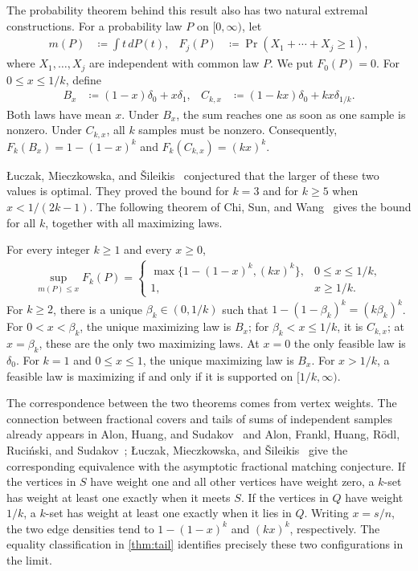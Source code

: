 The probability theorem behind this result also has two natural extremal constructions. For a probability law $P$ on $[0,\infty)$, let
\begin{align}
m(P)&\coloneqq\int t\,dP(t), &
F_j(P)&\coloneqq\Pr(X_1+\cdots+X_j\ge1),
\label{eq:tail-definition}
\end{align}
where $X_1,\ldots,X_j$ are independent with common law $P$. We put $F_0(P)=0$. For $0\le x\le1/k$, define
\begin{align}
B_x&\coloneqq(1-x)\delta_0+x\delta_1, &
C_{k,x}&\coloneqq(1-kx)\delta_0+kx\delta_{1/k}.
\label{eq:standard-laws}
\end{align}
Both laws have mean $x$. Under $B_x$, the sum reaches one as soon as one sample is nonzero. Under $C_{k,x}$, all $k$ samples must be nonzero. Consequently, $F_k(B_x)=1-(1-x)^k$ and $F_k(C_{k,x})=(kx)^k$.

{\L}uczak, Mieczkowska, and {\v S}ileikis~\cite{LMS2017} conjectured that the larger of these two values is optimal. They proved the bound for $k=3$ and for $k\ge5$ when $x<1/(2k-1)$. The following theorem of Chi, Sun, and Wang~\cite[Theorem 1.2]{CSW2026} gives the bound for all $k$, together with all maximizing laws.
\begin{theorem}\label{thm:tail}
For every integer $k\ge1$ and every $x\ge0$,
\begin{align}
\sup_{m(P)\le x}F_k(P)=
\begin{cases}
\max\{1-(1-x)^k,(kx)^k\},&0\le x\le1/k,\\
1,&x\ge1/k.
\end{cases}
\label{eq:sharp-tail}
\end{align}
For $k\ge2$, there is a unique $\beta_k\in(0,1/k)$ such that $1-(1-\beta_k)^k=(k\beta_k)^k$. For $0<x<\beta_k$, the unique maximizing law is $B_x$; for $\beta_k<x\le1/k$, it is $C_{k,x}$; at $x=\beta_k$, these are the only two maximizing laws. At $x=0$ the only feasible law is $\delta_0$. For $k=1$ and $0\le x\le1$, the unique maximizing law is $B_x$. For $x>1/k$, a feasible law is maximizing if and only if it is supported on $[1/k,\infty)$.
\end{theorem}

The correspondence between the two theorems comes from vertex weights. The connection between fractional covers and tails of sums of independent samples already appears in Alon, Huang, and Sudakov~\cite[Lemma 3.3]{AHS2012} and Alon, Frankl, Huang, R\"odl, Ruci\'nski, and Sudakov~\cite[proof of Theorem 2.1]{AFHRRS2012}; {\L}uczak, Mieczkowska, and {\v S}ileikis~\cite[Lemma 3.2]{LMS2017} give the corresponding equivalence with the asymptotic fractional matching conjecture. If the vertices in $S$ have weight one and all other vertices have weight zero, a $k$-set has weight at least one exactly when it meets $S$. If the vertices in $Q$ have weight $1/k$, a $k$-set has weight at least one exactly when it lies in $Q$. Writing $x=s/n$, the two edge densities tend to $1-(1-x)^k$ and $(kx)^k$, respectively. The equality classification in \cref{thm:tail} identifies precisely these two configurations in the limit.

